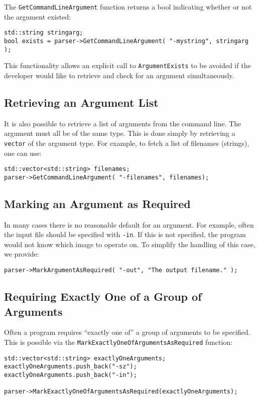 \documentclass{InsightArticle}
\begin{document}
The \verb|GetCommandLineArgument| function returns a bool indicating whether or not the argument existed:

\small
\begin{verbatim}
std::string stringarg;
bool exists = parser->GetCommandLineArgument( "-mystring", stringarg );
\end{verbatim}

This functionality allows an explicit call to \verb|ArgumentExists| to be avoided if the developer would like to retrieve and check for an argument simultaneously.


\subsection{Retrieving an Argument List}
It is also possible to retrieve a list of arguments from the command line. The argument must all be of the same type. This is done simply by retrieving a \verb|vector| of the argument type. For example, to fetch a list of filenames (strings), one can use:

\small
\begin{verbatim}
std::vector<std::string> filenames;
parser->GetCommandLineArgument( "-filenames", filenames);
\end{verbatim}
\normalsize 

\subsection{Marking an Argument as Required}
In many cases there is no reasonable default for an argument. For example, often the input file should be specified with \verb|-in|. If this is not specified, the program would not know which image to operate on. To simplify the handling of this case, we provide:

\small
\begin{verbatim}
parser->MarkArgumentAsRequired( "-out", "The output filename." );
\end{verbatim}
\normalsize 

\subsection{Requiring Exactly One of a Group of Arguments}
Often a program requires ``exactly one of'' a group of arguments to be specified. This is possible via the \verb|MarkExactlyOneOfArgumentsAsRequired| function:

\small
\begin{verbatim}
std::vector<std::string> exactlyOneArguments;
exactlyOneArguments.push_back("-sz");
exactlyOneArguments.push_back("-in");

parser->MarkExactlyOneOfArgumentsAsRequired(exactlyOneArguments);
\end{verbatim}
\normalsize 
\end{document}
